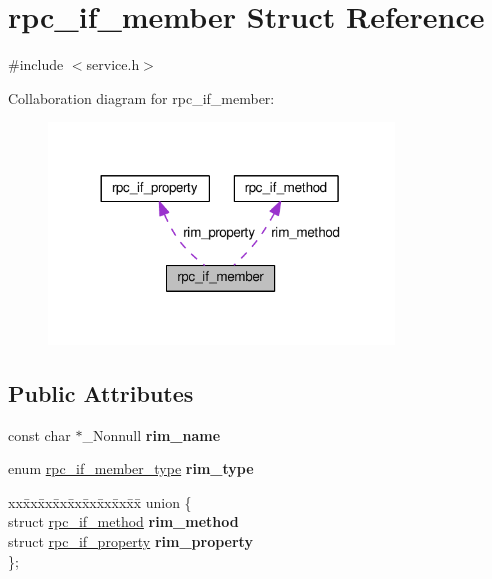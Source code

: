 \hypertarget{structrpc__if__member}{}\section{rpc\+\_\+if\+\_\+member Struct Reference}
\label{structrpc__if__member}


{\ttfamily \#include $<$service.\+h$>$}



Collaboration diagram for rpc\+\_\+if\+\_\+member\+:
\nopagebreak
\begin{figure}[H]
\begin{center}
\leavevmode
\includegraphics[width=260pt]{structrpc__if__member__coll__graph}
\end{center}
\end{figure}
\subsection*{Public Attributes}
\begin{DoxyCompactItemize}
\item 
const char $\ast$\+\_\+\+Nonnull {\bfseries rim\+\_\+name}\hypertarget{structrpc__if__member_a656607611d627c965972e4153523287e}{}\label{structrpc__if__member_a656607611d627c965972e4153523287e}

\item 
enum \hyperlink{service_8h_a543850b4e1fac65207114c51d9c3f1a4}{rpc\+\_\+if\+\_\+member\+\_\+type} {\bfseries rim\+\_\+type}\hypertarget{structrpc__if__member_a0ffdb5e81a707932149376d01c716b10}{}\label{structrpc__if__member_a0ffdb5e81a707932149376d01c716b10}

\item 
\begin{tabbing}
xx\=xx\=xx\=xx\=xx\=xx\=xx\=xx\=xx\=\kill
union \{\\
\>struct \hyperlink{structrpc__if__method}{rpc\_if\_method} {\bfseries rim\_method}\\
\>struct \hyperlink{structrpc__if__property}{rpc\_if\_property} {\bfseries rim\_property}\\
\}; \hypertarget{structrpc__if__member_a7c950b405b6852b3038ae847d0b7e2e0}{}\label{structrpc__if__member_a7c950b405b6852b3038ae847d0b7e2e0}
\\

\end{tabbing}\end{DoxyCompactItemize}


